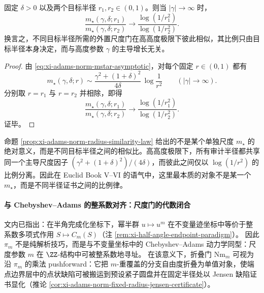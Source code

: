 \begin{proposition}[不同目标半径的相似比率律]\label{prop:xi-adams-norm-radius-similarity-law}
固定 \(\delta>0\) 以及两个目标半径 \(r_1,r_2\in(0,1)\)。则当 \(|\gamma|\to\infty\) 时，
\[
\frac{m_\star(\gamma,\delta;r_1)}{m_\star(\gamma,\delta;r_2)}
\longrightarrow
\frac{\log(1/r_1^{2})}{\log(1/r_2^{2})}.
\]
换言之，不同目标半径所需的外置尺度门在高高度极限下彼此相似，其比例只由目标半径本身决定，而与高度参数 \(\gamma\) 的主导增长无关。
\end{proposition}

\begin{proof}
由 \eqref{eq:xi-adams-norm-mstar-asymptotic}，对每个固定 \(r\in(0,1)\) 都有
\[
m_\star(\gamma,\delta;r)
\sim
\frac{\gamma^{2}+(1+\delta)^{2}}{4\delta}\,\log\!\frac{1}{r^{2}}
\qquad(|\gamma|\to\infty).
\]
分别取 \(r=r_1\) 与 \(r=r_2\) 并相除，即得
\[
\frac{m_\star(\gamma,\delta;r_1)}{m_\star(\gamma,\delta;r_2)}
\longrightarrow
\frac{\log(1/r_1^{2})}{\log(1/r_2^{2})}.
\]
证毕。
\end{proof}

\begin{remark}\label{rem:xi-adams-norm-radius-bookVVI-reading}
命题 \ref{prop:xi-adams-norm-radius-similarity-law} 给出的不是某个单独尺度 \(m_\star\) 的绝对意义，而是不同目标半径之间的相似比。高高度极限下，所有审计半径都共享同一个主导尺度因子 \((\gamma^{2}+(1+\delta)^{2})/(4\delta)\)，而彼此之间仅以 \(\log(1/r^2)\) 的比例分离。因此在 Euclid Book V--VI 的语气中，这里最本质的对象不是某一个 \(m_\star\)，而是不同半径证书之间的比例律。
\end{remark}

\paragraph{与 Chebyshev--Adams 的整系数对齐：尺度门的代数闭合}
文内已指出：在半角完成化坐标下，幂半群 \(u\mapsto u^m\) 在不变量迹坐标中等价于整系数多项式作用 \(S\mapsto C_m(S)\)（注 \ref{rem:xi-half-angle-endpoint-paradigm}）。
因此 \(\pi_m\) 不是纯解析技巧，而是与不变量坐标中的 Chebyshev--Adams 动力学同型：尺度参数 \(m\) 在 \(\ZZ\)-结构中可被整系数地寻址。
在该意义下，折叠门 \(\mathrm{Nm}_m\) 可视为沿 \(\pi_m\) 的乘法 pushforward：它把 \(m\)-重覆盖的分支自由度折叠为单值对象，使端点边界层中的点状缺陷可被搬运到预设紧子圆盘并在固定半径处以 Jensen 缺陷证书显化（推论 \ref{cor:xi-adams-norm-fixed-radius-jensen-certificate}）。

